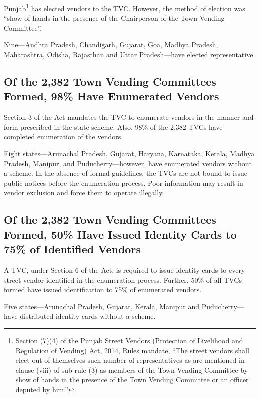 \documentclass[a4paper, 12pt, twoside]{article}
\begin{document}
{	Punjab\footnote{Section (7)(4) of the Punjab Street Vendors (Protection of Livelihood and Regulation of Vending) Act, 2014, Rules mandate, “The street vendors shall elect out of themselves such number of representatives as are mentioned in clause (viii) of sub-rule (3) as members of the Town Vending Committee by show of hands in the presence of the Town Vending Committee or an officer deputed by him.”} has elected vendors to the TVC. However, the method of election was  “show of hands in the presence of the Chairperson of the Town Vending Committee”.

	Nine—Andhra Pradesh, Chandigarh, Gujarat, Goa, Madhya Pradesh, Maharashtra, Odisha, Rajasthan and Uttar Pradesh—have elected representative.

\subsection*{Of the 2,382 Town Vending Committees Formed, 98\% Have Enumerated Vendors}
	Section 3 of the Act mandates the TVC to enumerate vendors in the manner and form prescribed in the state scheme. Also, 98\% of the 2,382 TVCs have completed enumeration of the vendors.

	Eight states—Arunachal Pradesh, Gujarat, Haryana, Karnataka, Kerala, Madhya Pradesh, Manipur, and Puducherry—however, have enumerated vendors without a scheme. In the absence of formal guidelines, the TVCs are not bound to issue public notices before the enumeration process. Poor information may result in vendor exclusion and force them to operate illegally.

\subsection*{Of the 2,382 Town Vending Committees Formed, 50\% Have Issued Identity Cards to 75\% of Identified Vendors}

	A TVC, under Section 6 of the Act, is required to issue identity cards to every street vendor identified in the enumeration process.  Further, 50\% of all TVCs formed have issued identification to 75\% of enumerated vendors.

	Five states—Arunachal Pradesh, Gujarat, Kerala, Manipur and Puducherry—have distributed identity cards without a scheme.

}
\end{document}
